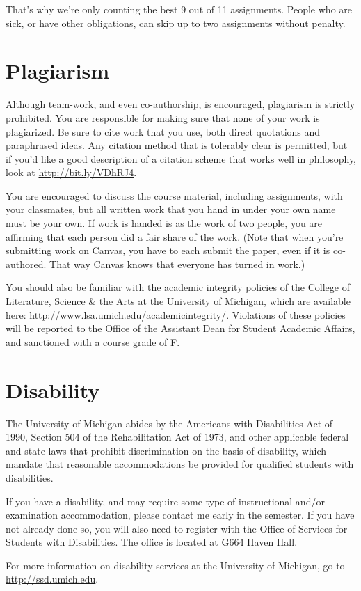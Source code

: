 \documentclass[
  letterpaper,
  DIV=11,
  numbers=noendperiod]{scrartcl}
\begin{document}
That's why we're only counting the best 9 out of 11 assignments. People
who are sick, or have other obligations, can skip up to two assignments
without penalty.

\section{Plagiarism}\label{plagiarism}

Although team-work, and even co-authorship, is encouraged, plagiarism is
strictly prohibited. You are responsible for making sure that none of
your work is plagiarized. Be sure to cite work that you use, both direct
quotations and paraphrased ideas. Any citation method that is tolerably
clear is permitted, but if you'd like a good description of a citation
scheme that works well in philosophy, look at
\url{http://bit.ly/VDhRJ4}.

You are encouraged to discuss the course material, including
assignments, with your classmates, but all written work that you hand in
under your own name must be your own. If work is handed is as the work
of two people, you are affirming that each person did a fair share of
the work. (Note that when you're submitting work on Canvas, you have to
each submit the paper, even if it is co-authored. That way Canvas knows
that everyone has turned in work.)

You should also be familiar with the academic integrity policies of the
College of Literature, Science \& the Arts at the University of
Michigan, which are available here:
\url{http://www.lsa.umich.edu/academicintegrity/}. Violations of these
policies will be reported to the Office of the Assistant Dean for
Student Academic Affairs, and sanctioned with a course grade of F.

\section{Disability}\label{disability}

The University of Michigan abides by the Americans with Disabilities Act
of 1990, Section 504 of the Rehabilitation Act of 1973, and other
applicable federal and state laws that prohibit discrimination on the
basis of disability, which mandate that reasonable accommodations be
provided for qualified students with disabilities.

If you have a disability, and may require some type of instructional
and/or examination accommodation, please contact me early in the
semester. If you have not already done so, you will also need to
register with the Office of Services for Students with Disabilities. The
office is located at G664 Haven Hall.

For more information on disability services at the University of
Michigan, go to \url{http://ssd.umich.edu}.
\end{document}
